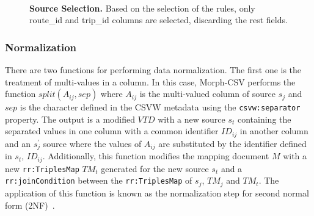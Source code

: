 \begin{figure}[th]
\centering
{}\\
\caption[Source selection]{\textbf{Source Selection.} Based on the selection of the rules, only route\_id and trip\_id columns are selected, discarding the rest fields.}
\label{fig:selection2}
\end{figure}

\subsubsection*{Normalization}
There are two functions for performing data normalization. The first one is the treatment of multi-values in a column. In this case, Morph-CSV performs the function $split(A_{ij},sep)$ where $A_{ij}$ is the multi-valued column of source $s_{j}$ and $sep$ is the character defined in the CSVW metadata using the \texttt{csvw:separator} property. The output is a modified $VTD$ with a new source $s_t$ containing the separated values in one column with a common identifier $ID_{ij}$ in another column and an $s_{j}^{'}$ source where the values of $A_{ij}$ are substituted by the identifier defined in $s_t$, $ID_{ij}$. Additionally, this function modifies the mapping document $M$ with a new \texttt{rr:TriplesMap} $TM_t$ generated for the new source $s_t$ and a \texttt{rr:joinCondition} between the \texttt{rr:TriplesMap} of $s_j$, $TM_j$ and $TM_t$. The application of this function is known as the normalization step for second normal form (2NF)~\citep{codd1979extending}.
 
